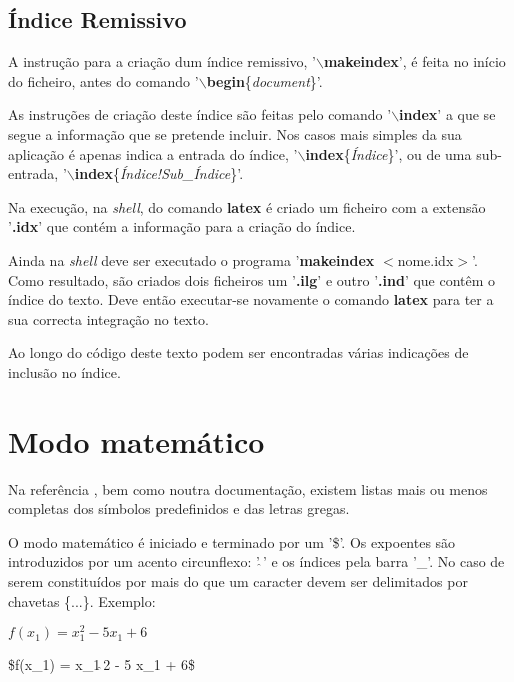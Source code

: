 \documentclass[a4paper,12pt]{article}
\begin{document}
\subsection{Índice Remissivo}

A instrução para a criação dum índice remissivo, 
'{\bf $\backslash$makeindex}', é feita no início do ficheiro, antes do
comando '$\backslash${\bf begin}\{{\it document}\}'.

As instruções de criação deste índice são feitas pelo comando
'$\backslash${\bf index}' a que se segue a informação que se
pretende incluir. Nos casos mais simples da sua aplicação
é apenas indica a entrada do índice, 
'$\backslash${\bf index}\{{\it Índice}\}', ou de uma sub-entrada, 
'$\backslash${\bf index}\{{\it Índice!Sub\_Índice}\}'.

Na execução, na {\it shell}, do comando {\bf latex}
é criado um ficheiro com a extensão '{\bf .idx}' que contém a informação
para a criação do índice.

Ainda na {\it shell} deve ser executado o
programa '{\bf makeindex} $<$nome.idx$>$'. Como resultado, 
são criados dois ficheiros um '{\bf .ilg}' e outro '{\bf .ind}' 
que contêm o índice do texto. 
Deve então executar-se novamente o comando {\bf latex} para ter
a sua correcta integração no texto.

Ao longo do código deste texto podem ser encontradas várias
indicações de inclusão no índice.

\break

\section{Modo matemático}

Na referência \cite{TUG:2000}, bem como noutra documentação, 
existem listas mais ou menos completas dos símbolos predefinidos
e das letras gregas.

O modo matemático é iniciado e terminado por um '\$'.
Os expoentes são introduzidos por um acento circunflexo: '$\hat{\ }$'
e os índices pela barra '\_'. No caso de serem constituídos por 
mais do que um caracter devem ser delimitados por chavetas \{...\}.
Exemplo:

\begin{multicols}{2}
\vskip 2mm
\par
$f(x_1) = x_1^2 - 5 x_1 + 6$
\par
{}
\vskip 2mm
\$f(x\_1) = x\_1$\hat{\ }$2 - 5 x\_1 + 6\$
\end{multicols}
\end{document}
